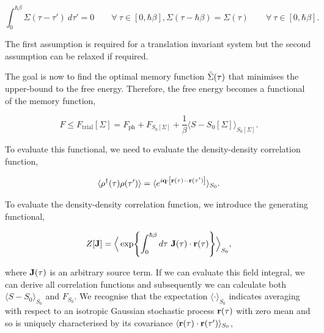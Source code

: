 \begin{subequations}
    \begin{equation}
        \int_0^{\hbar\beta} \Sigma(\tau - \tau')\ d\tau' = 0 \qquad \forall\ \tau \in [0, \hbar\beta],
    \end{equation}
    \begin{equation}
        \Sigma(\tau - \hbar\beta) = \Sigma(\tau) \qquad \forall\ \tau \in [0, \hbar\beta].
    \end{equation}
\end{subequations}

The first assumption is required for a translation invariant system but the second assumption can be relaxed if required. 
\newline

The goal is now to find the optimal memory function $\Tilde{\Sigma}(\tau)$ that minimises the upper-bound to the free energy. Therefore, the free energy becomes a functional of the memory function,

\begin{equation}
    F \leq F_{\text{trial}} \left[ \Sigma \right] = F_{\text{ph}} + F_{S_0[\Sigma]} + \frac{1}{\beta} \langle S - S_0[\Sigma] \rangle_{S_0[\Sigma]}.
\end{equation}

To evaluate this functional, we need to evaluate the density-density correlation function,

\begin{equation}
    \langle \rho^{\dagger}(\tau) \rho(\tau') \rangle = \langle e^{i \vb{q} \cdot \left[ \vb{r}(\tau) - \vb{r}(\tau') \right]} \rangle_{S_0} .
\end{equation}

To evaluate the density-density correlation function, we introduce the generating functional,

\begin{equation}
    Z[\vb{J}] = \Big\langle \exp{\int_0^{\hbar\beta} d\tau\ \vb{J}(\tau) \cdot \vb{r}(\tau) } \Big\rangle_{S_0},
\end{equation}

where $\vb{J}(\tau)$ is an arbitrary source term. If we can evaluate this field integral, we can derive all correlation functions and subsequently we can calculate both $\langle S - S_0 \rangle_{S_0}$ and $F_{S_0}$. We recognise that the expectation $\langle \cdot \rangle_{S_0}$ indicates averaging with respect to an isotropic Gaussian stochastic process $\vb{r}(\tau)$ with zero mean and so is uniquely characterised by its covariance $\langle \vb{r}(\tau) \cdot \vb{r}(\tau') \rangle_{S_0}$,

